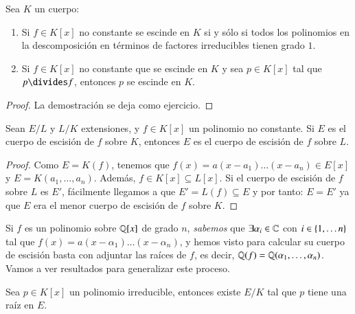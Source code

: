 \begin{lm}\label{lm:3.1}
    Sea $K$ un cuerpo:\\
    \begin{enumerate}
        \item Si $f \in K[x]$ no constante se escinde en $K$ si y sólo si todos los polinomios en la descomposición en términos de factores irreducibles tienen grado $1$.
        \item Si $f \in K[x]$ no constante que se escinde en $K$ y sea $p \in K[x]$ tal que $p \divides f$, entonces $p$ se escinde en $K$.
    \end{enumerate}
\end{lm}

\begin{proof}
    La demostración se deja como ejercicio.
\end{proof}

\begin{lm}\label{lm:3.2}
    Sean $E/L$ y $L/K$ extensiones, y $f \in K[x]$ un polinomio no constante. Si $E$ es el cuerpo de escisión de $f$ sobre $K$, entonces $E$ es el cuerpo de escisión de $f$ sobre $L$.
\end{lm}

\begin{proof}
    Como $E = K(f)$, tenemos que $f(x) = a (x - a_1) \ldots (x - a_n) \in E[x]$ y $E = K(a_1, \ldots, a_n)$. Además, $f \in K[x] \subseteq L[x]$. Si el cuerpo de escisión de $f$ sobre $L$ es $E'$, fácilmente llegamos a que $E' = L(f) \subseteq E$ y por tanto: $E = E'$ ya que $E$ era el menor cuerpo de escisión de $f$ sobre $K$.
\end{proof}

Si $f$ es un polinomio sobre $\mathbb{Q}[x]$ de grado $n$, \textit{sabemos} que $\exists \alpha_i \in \mathbb{C}$ con $i \in \left\{1, \ldots n\right\}$ tal que $f(x) = a (x - \alpha_1) \ldots (x - \alpha_n)$, y hemos visto para calcular su cuerpo de escisión basta con adjuntar las raíces de $f$, es decir, $\mathbb{Q}(f) = \mathbb{Q}(\alpha_1, \ldots, \alpha_n)$.\\

Vamos a ver resultados para generalizar este proceso.

\begin{lm}\label{lm:3.3}
    Sea $p \in K[x]$ un polinomio irreducible, entonces existe $E/K$ tal que $p$ tiene una raíz en $E$.
\end{lm}

